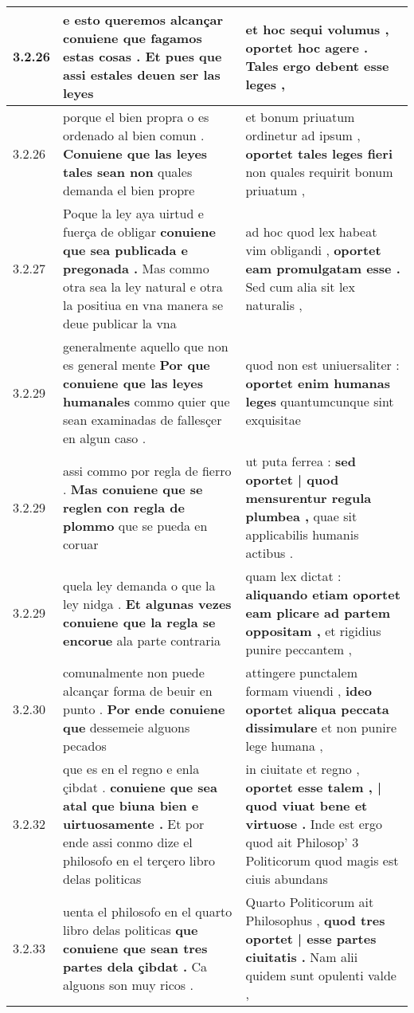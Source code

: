 \begin{tabular}{|p{1cm}|p{6.5cm}|p{6.5cm}|}
3.2.26 & e esto queremos alcançar \textbf{ conuiene que fagamos estas cosas . } Et pues que assi estales deuen ser las leyes & et hoc sequi volumus , \textbf{ oportet hoc agere . } Tales ergo debent esse leges , \\\hline
3.2.26 & porque el bien propra o es ordenado al bien comun . \textbf{ Conuiene que las leyes tales sean non } quales demanda el bien propre & et bonum priuatum ordinetur ad ipsum , \textbf{ oportet tales leges fieri } non quales requirit bonum priuatum , \\\hline
3.2.27 & Poque la ley aya uirtud e fuerça de obligar \textbf{ conuiene que sea publicada e pregonada . } Mas commo otra sea la ley natural e otra la positiua en vna manera se deue publicar la vna & ad hoc quod lex habeat vim obligandi , \textbf{ oportet eam promulgatam esse . } Sed cum alia sit lex naturalis , \\\hline
3.2.29 & generalmente aquello que non es general mente \textbf{ Por que conuiene que las leyes humanales } commo quier que sean examinadas de fallesçer en algun caso . & quod non est uniuersaliter : \textbf{ oportet enim humanas leges } quantumcunque sint exquisitae \\\hline
3.2.29 & assi commo por regla de fierro . \textbf{ Mas conuiene que se reglen con regla de plommo } que se pueda en coruar & ut puta ferrea : \textbf{ sed oportet | quod mensurentur regula plumbea , } quae sit applicabilis humanis actibus . \\\hline
3.2.29 & quela ley demanda o que la ley nidga . \textbf{ Et algunas vezes conuiene que la regla se encorue } ala parte contraria & quam lex dictat : \textbf{ aliquando etiam oportet eam plicare ad partem oppositam , } et rigidius punire peccantem , \\\hline
3.2.30 & comunalmente non puede alcançar forma de beuir en punto . \textbf{ Por ende conuiene que } dessemeie alguons pecados & attingere punctalem formam viuendi , \textbf{ ideo oportet aliqua peccata dissimulare } et non punire lege humana , \\\hline
3.2.32 & que es en el regno e enla çibdat . \textbf{ conuiene que sea atal que biuna bien e uirtuosamente . } Et por ende assi conmo dize el philosofo en el terçero libro delas politicas & in ciuitate et regno , \textbf{ oportet esse talem , | quod viuat bene et virtuose . } Inde est ergo quod ait Philosop’ 3 Politicorum quod magis est ciuis abundans \\\hline
3.2.33 & uenta el philosofo en el quarto libro delas politicas \textbf{ que conuiene que sean tres partes dela çibdat . } Ca alguons son muy ricos . & Quarto Politicorum ait Philosophus , \textbf{ quod tres oportet | esse partes ciuitatis . } Nam alii quidem sunt opulenti valde , \\\hline

\end{tabular}
